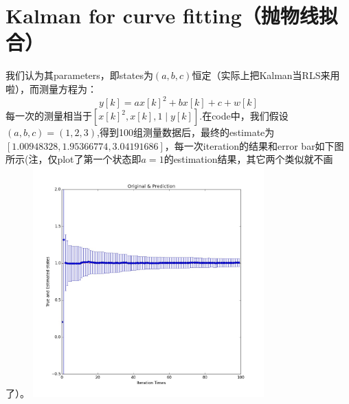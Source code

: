 \documentclass[10pt,journal,onecolumn]{IEEEtran}
\begin{document}
\section{Kalman for curve fitting（抛物线拟合）}
\label{sec-3}
我们认为其parameters，即states为\((a,b,c)\)恒定（实际上把Kalman当RLS来用啦），而测量方程为：
\begin{equation}
y[k]=ax[k]^2+bx[k]+c+w[k]
\end{equation}
每一次的测量相当于\([x[k]^2,x[k],1\mid y[k]]\).在code中，我们假设\((a,b,c)=(1, 2, 3)\),得到100组测量数据后，最终的estimate为\([ 1.00948328,1.95366774,3.04191686]\)，每一次iteration的结果和error bar如下图所示(注，仅plot了第一个状态即\(a=1\)的estimation结果，其它两个类似就不画了）。
\includegraphics[width=3.5in]{kalman.jpeg}
\end{document}
